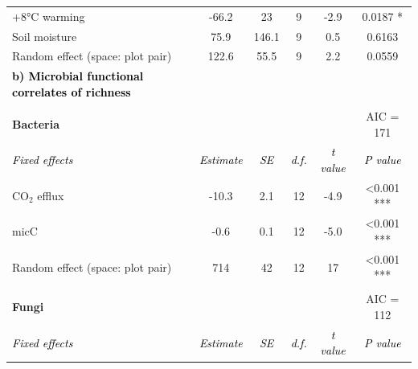 \documentclass[
  letterpaper,
  DIV=11,
  numbers=noendperiod]{scrartcl}
\begin{document}
\begin{table}[H]
\begin{tabular}[t]{lccccc}
\hspace{1em}\hspace{1em}+8°C warming & -66.2 & 23 & 9 & -2.9 & 0.0187 *\\
\hspace{1em}\hspace{1em}Soil moisture & 75.9 & 146.1 & 9 & 0.5 & 0.6163\\
\midrule
\hspace{1em}Random effect (space: plot pair) & 122.6 & 55.5 & 9 & 2.2 & 0.0559\\
\midrule
\begingroup\fontsize{9}{11}\selectfont \textcolor{black}{\textbf{b) Microbial functional correlates of richness}}\endgroup & \begingroup\fontsize{9}{11}\selectfont \textcolor{black}{\textbf{}}\endgroup & \begingroup\fontsize{9}{11}\selectfont \textcolor{black}{\textbf{}}\endgroup & \begingroup\fontsize{9}{11}\selectfont \textcolor{black}{\textbf{}}\endgroup & \begingroup\fontsize{9}{11}\selectfont \textcolor{black}{\textbf{}}\endgroup & \begingroup\fontsize{9}{11}\selectfont \textcolor{black}{\textbf{}}\endgroup\\
\addlinespace[-0.8em]
\multicolumn{6}{l}{\textbf{}}\\
\hspace{1em}\textbf{Bacteria} &  &  &  &  & AIC = 171\\
\midrule
\textcolor{black}{\em{\hspace{1em}Fixed effects}} & \textcolor{black}{\em{Estimate}} & \textcolor{black}{\em{SE}} & \textcolor{black}{\em{d.f.}} & \textcolor{black}{\em{t value}} & \textcolor{black}{\em{P \vphantom{3} value}}\\
\midrule
\hspace{1em}\hspace{1em}CO$_{2}$ efflux & -10.3 & 2.1 & 12 & -4.9 & <0.001 ***\\
\hspace{1em}\hspace{1em}micC & -0.6 & 0.1 & 12 & -5.0 & <0.001 ***\\
\midrule
\hspace{1em}Random effect (space: plot pair) & 714 & 42 & 12 & 17 & <0.001 ***\\
\midrule
\addlinespace[-1em]
\multicolumn{6}{l}{\textbf{}}\\
\hspace{1em}\textbf{Fungi} &  &  &  &  & AIC = 112\\
\midrule
\textcolor{black}{\em{\hspace{1em}Fixed effects}} & \textcolor{black}{\em{Estimate}} & \textcolor{black}{\em{SE}} & \textcolor{black}{\em{d.f.}} & \textcolor{black}{\em{t value}} & \textcolor{black}{\em{P \vphantom{2} value}}\\

\end{tabular}
\end{table}
\end{document}

